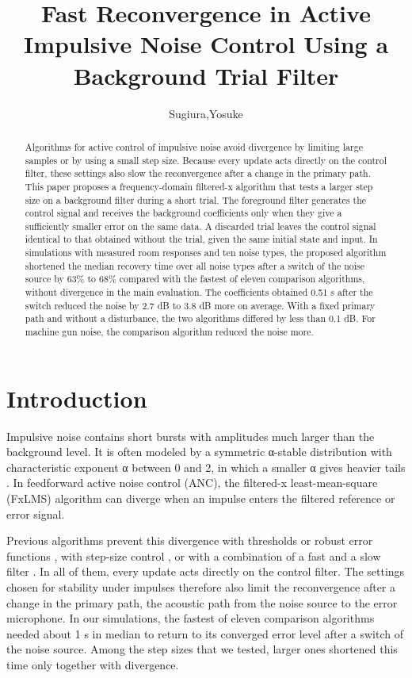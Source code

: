 \documentclass[sip,biber]{now-journal}
\title{Fast Reconvergence in Active Impulsive Noise Control Using a Background Trial Filter}
\author[1*]{Sugiura,Yosuke}
\affil[1]{School of Science and Technology, Meiji University, Kawasaki, Japan}
\begin{document}
\begin{abstract}
Algorithms for active control of impulsive noise avoid divergence by limiting large samples or by using a small step size. Because every update acts directly on the control filter, these settings also slow the reconvergence after a change in the primary path. This paper proposes a frequency-domain filtered-x algorithm that tests a larger step size on a background filter during a short trial. The foreground filter generates the control signal and receives the background coefficients only when they give a sufficiently smaller error on the same data. A discarded trial leaves the control signal identical to that obtained without the trial, given the same initial state and input. In simulations with measured room responses and ten noise types, the proposed algorithm shortened the median recovery time over all noise types after a switch of the noise source by 63\% to 68\% compared with the fastest of eleven comparison algorithms, without divergence in the main evaluation. The coefficients obtained 0.51 s after the switch reduced the noise by 2.7 dB to 3.8 dB more on average. With a fixed primary path and without a disturbance, the two algorithms differed by less than 0.1 dB. For machine gun noise, the comparison algorithm reduced the noise more.
\end{abstract}
\hypertarget{sec:1}{%
\section{Introduction}\label{sec:1}}

Impulsive noise contains short bursts with amplitudes much larger than the background level. It is often modeled by a symmetric α-stable distribution with characteristic exponent α between 0 and 2, in which a smaller α gives heavier tails \cite{shao1993}. In feedforward active noise control (ANC), the filtered-x least-mean-square (FxLMS) algorithm \cite{kuo1996} can diverge when an impulse enters the filtered reference or error signal.

Previous algorithms prevent this divergence with thresholds or robust error functions \cite{sun2006,akhtar2009,wu2011,feng2024}, with step-size control \cite{sugiura2026}, or with a combination of a fast and a slow filter \cite{ferrer2013}. In all of them, every update acts directly on the control filter. The settings chosen for stability under impulses therefore also limit the reconvergence after a change in the primary path, the acoustic path from the noise source to the error microphone. In our simulations, the fastest of eleven comparison algorithms needed about 1 s in median to return to its converged error level after a switch of the noise source. Among the step sizes that we tested, larger ones shortened this time only together with divergence.
\end{document}
